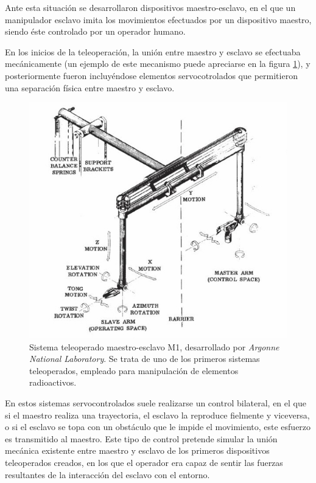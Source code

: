 Ante esta situación se desarrollaron dispositivos maestro-esclavo, en el que un manipulador esclavo imita los movimientos efectuados por un dispositivo maestro, siendo éste controlado por un operador humano. \par 

En los inicios de la teleoperación, la unión entre maestro y esclavo se efectuaba mecánicamente (un ejemplo de este mecanismo puede apreciarse en la figura \ref{fig:M1-manipulador}), y posteriormente fueron incluyéndose elementos servocotrolados que permitieron una separación física entre maestro y esclavo. \par 

\begin{figure}[h!]
\centering
\includegraphics[scale=0.65]{Figuras/M1-manipulador}
\caption[Sistema teleoperado maestro-esclavo M1]{Sistema teleoperado maestro-esclavo M1, desarrollado por \emph{Argonne National Laboratory}. Se trata de uno de los primeros sistemas teleoperados, empleado para manipulación de elementos radioactivos.}
\label{fig:M1-manipulador}
\end{figure}

En estos sistemas servocontrolados suele realizarse un control bilateral, en el que si el maestro realiza una trayectoria, el esclavo la reproduce fielmente y viceversa, o si el esclavo se topa con un obstáculo que le impide el movimiento, este esfuerzo es transmitido al maestro. Este tipo de control pretende simular la unión mecánica existente entre maestro y esclavo de los primeros dispositivos teleoperados creados, en los que el operador era capaz de sentir las fuerzas resultantes de la interacción del esclavo con el entorno. \par 

